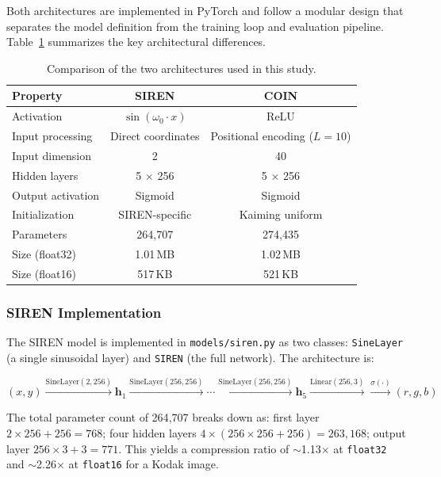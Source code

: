 \documentclass[a4paper,oneside,11pt,english]{scrartcl}
\begin{document}
Both architectures are implemented in PyTorch and follow a modular design
that separates the model definition from the training loop and evaluation
pipeline.  Table~\ref{tab:architecture} summarizes the key architectural
differences.

\begin{table}[H]
\centering
\caption{Comparison of the two architectures used in this study.}
\label{tab:architecture}
\begin{tabular}{lcc}
\toprule
Property & SIREN & COIN \\
\midrule
Activation & $\sin(\omega_0 \cdot x)$ & ReLU \\
Input processing & Direct coordinates & Positional encoding ($L=10$) \\
Input dimension & 2 & 40 \\
Hidden layers & 5 $\times$ 256 & 5 $\times$ 256 \\
Output activation & Sigmoid & Sigmoid \\
Initialization & SIREN-specific & Kaiming uniform \\
Parameters & 264{,}707 & 274{,}435 \\
Size (float32) & 1.01\,MB & 1.02\,MB \\
Size (float16) & 517\,KB & 521\,KB \\
\bottomrule
\end{tabular}
\end{table}

\subsubsection{SIREN Implementation}

The SIREN model is implemented in \texttt{models/siren.py} as two classes:
\texttt{SineLayer} (a single sinusoidal layer) and \texttt{SIREN} (the
full network).  The architecture is:

\begin{equation}
    (x, y) \xrightarrow{\text{SineLayer}(2, 256)}
    \mathbf{h}_1 \xrightarrow{\text{SineLayer}(256, 256)} \cdots
    \xrightarrow{\text{SineLayer}(256, 256)}
    \mathbf{h}_5 \xrightarrow{\text{Linear}(256, 3)}
    \xrightarrow{\sigma(\cdot)} (r, g, b)
\end{equation}

The total parameter count of 264{,}707 breaks down as: first layer
$2 \times 256 + 256 = 768$; four hidden layers $4 \times (256 \times 256 +
256) = 263{,}168$; output layer $256 \times 3 + 3 = 771$.  This yields a
compression ratio of $\sim$1.13$\times$ at \texttt{float32} and
$\sim$2.26$\times$ at \texttt{float16} for a Kodak image.
\end{document}
